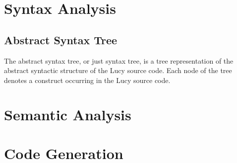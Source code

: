 \section{Syntax Analysis}

\subsection{Abstract Syntax Tree}
The abstract syntax tree, or just syntax tree, is a tree representation of the abstract syntactic structure of the Lucy source code. Each node of the tree denotes a construct occurring in the Lucy source code.
\section{Semantic Analysis}



\section{Code Generation}
